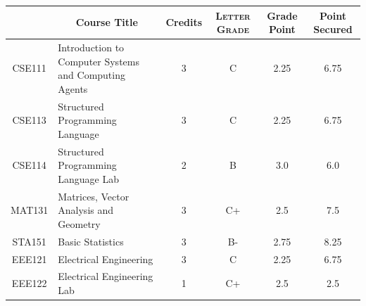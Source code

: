\documentclass[11pt]{article}
\newcommand*{\numtwo}[1]{\pgfmathprintnumber[
                    fixed, precision=2, fixed zerofill=true]{#1}}
\begin{document}
                \begin{center}
                    \renewcommand{\arraystretch}{1.08}
                    
                \begin{tabular}{|c|l|c|>{\scshape}c|c|c|}
                \hline  \rule[-1ex]{0pt}{3.5ex} {\centering{\bf Course Code}} &  \multicolumn{1}{c|}{\textbf{Course Title}}  & {\bf Credits} & {\bf Letter Grade} & {\bf Grade Point} & {\bf Point Secured}  \\ 
                \hline   CSE111 &  Introduction to Computer Systems and Computing Agents		 & 3 & C & 2.25 & 6.75 \\ %
                \hline   CSE113 &  Structured Programming Language		 & 3 & C & 2.25 & 6.75 \\ %
                \hline   CSE114 &  Structured Programming Language Lab		 & 2 & B & 3.0 & 6.0 \\ %
                \hline   MAT131 &  Matrices, Vector Analysis and Geometry		 & 3 & C+ & 2.5 & 7.5 \\ %
                \hline   STA151 &  Basic Statistics		 & 3 & B- & 2.75 & 8.25 \\ %
                \hline   EEE121 &  Electrical Engineering		 & 3 & C & 2.25 & 6.75 \\ %
                \hline   EEE122 &  Electrical Engineering Lab		 & 1 & C+ & 2.5 & 2.5 \\ %

\hline                %
                \end{tabular}
                \end{center}
                \renewcommand{\arraystretch}{1.03}
\end{document}
